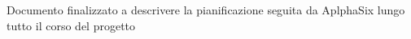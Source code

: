 Documento finalizzato a descrivere la pianificazione seguita da AplphaSix lungo tutto il corso del progetto 